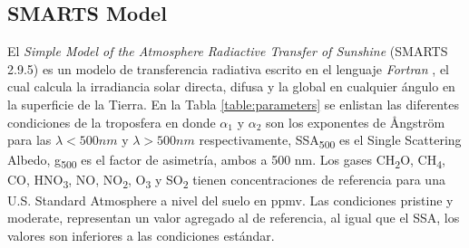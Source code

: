 \subsection{SMARTS Model}
El \textit{Simple Model of the Atmosphere Radiactive Transfer of Sunshine} (SMARTS 2.9.5) es un modelo de transferencia radiativa escrito en el lenguaje \textit{Fortran} \cite{Gueymard1995}, el cual calcula la irradiancia solar directa, difusa y la global en cualquier ángulo en la superficie de la Tierra. En la Tabla \ref{table:parameters} se enlistan las diferentes condiciones de la troposfera en donde $\alpha_1$ y $\alpha_2$ son los exponentes de \AA ngstr\"om para las $\lambda<500nm$ y $\lambda>500nm$ respectivamente, SSA\textsubscript{500} es el Single Scattering Albedo, g\textsubscript{500} es el factor de asimetría, ambos a 500 nm. Los gases CH\textsubscript{2}O, CH\textsubscript{4}, CO, HNO\textsubscript{3}, NO, NO\textsubscript{2}, O\textsubscript{3} y SO\textsubscript{2} tienen concentraciones de referencia para una U.S. Standard Atmosphere a nivel del suelo en ppmv. Las condiciones pristine y moderate, representan un valor agregado al de referencia, al igual que el SSA, los valores son inferiores a las condiciones estándar. \cite{Gueymard1995}
